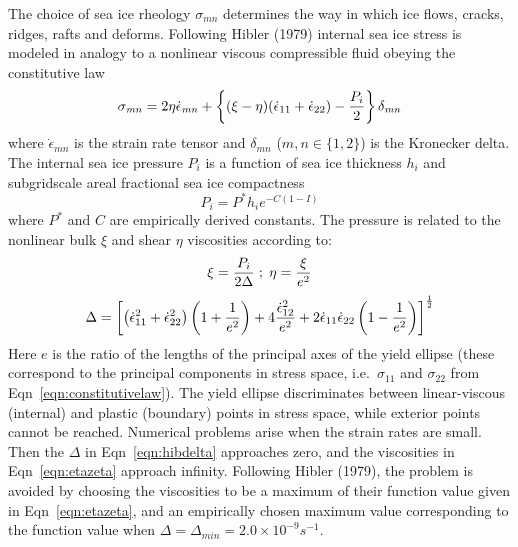 The choice of sea ice rheology $\sigma_{\mathit{mn}}$ determines 
the way in which ice flows, cracks, ridges, rafts and deforms.
Following Hibler (1979) internal sea ice stress is modeled
in analogy to  a nonlinear viscous compressible fluid obeying
the constitutive law
\begin{equation}
\label{eqn:constitutivelaw}
\sigma_{\mathit{mn}}=2\eta\dot\epsilon_{\mathit{mn}} +
\left\{(\xi -\eta)(\dot\epsilon_{11} + \dot\epsilon_{22}) -
{P_i\over{2}}\right\}
\delta_{\mathit{mn}}
\end{equation}
where $\dot\epsilon_{\mathit{mn}}$ is the strain rate tensor
and $\delta_{\mathit{mn}}$ 
($m,n \in \{1,2\}$) 
is the Kronecker delta.
The internal sea ice pressure $P_i$ 
is a function of 
sea ice thickness $h_i$
and subgridscale areal fractional sea ice compactness
\begin{equation}
\label{eqn:hibpress}
P_i = P^*h_i e^{-C(1-I)}
\end{equation}
where $P^*$ and $C$ are empirically derived constants.
The pressure is related to the nonlinear bulk $\xi$ and shear $\eta$ viscosities according to:
\begin{equation}\label{eqn:etazeta}
\xi = {P_i\over{2\Delta}} \hspace*{.1cm};\hspace*{.1cm} \eta = {\xi \over{e^2}}
\end{equation}
\begin{equation}\label{eqn:hibdelta}
\Delta = \left[ \left(\dot\epsilon_{11}^2 +
\dot\epsilon_{22}^2\right)\left(1+{1\over{e^2}}\right)
+4{\dot\epsilon_{12}^2\over{e^2}} +
2 \dot\epsilon_{11}\dot\epsilon_{22}\left(1-{1\over{e^2}}\right)
\right]^{\frac{1}{2}}
\end{equation}
Here $e$ is the ratio of the lengths
of the principal axes of the yield ellipse
(these correspond to the principal components in stress space,
i.e.\ $\sigma_{11}$ and $\sigma_{22}$ from Eqn~\ref{eqn:constitutivelaw}).
The yield ellipse discriminates between linear-viscous (internal)
and plastic (boundary) points in stress space, 
while exterior points cannot be reached.
Numerical problems arise when the strain rates are small.
Then the $\Delta$ in Eqn~\ref{eqn:hibdelta} approaches zero,
and the viscosities in Eqn~\ref{eqn:etazeta} approach infinity.
Following Hibler (1979), \nocite{hibler79}
the problem is avoided by choosing the viscosities to be a maximum of their
function value given in Eqn~\ref{eqn:etazeta},
and an empirically chosen maximum value corresponding to
the function value when 
\mbox{$\Delta = \Delta_{\mathit{min}} = 2.0 \times 10^{-9} s^{-1}$}.

